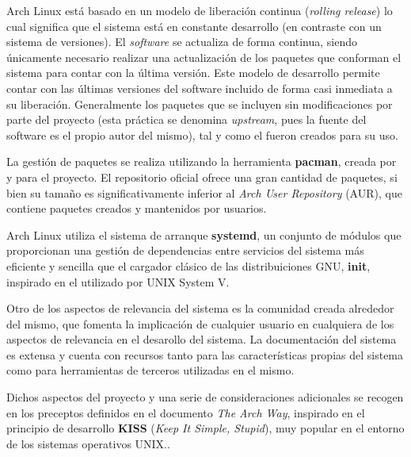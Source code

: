 Arch Linux está basado en un modelo de liberación continua (\textit{rolling release}) lo cual significa que el sistema está en constante desarrollo (en contraste con un sistema de versiones). El \textit{software} se actualiza de forma continua, siendo únicamente necesario realizar una actualización de los paquetes que conforman el sistema para contar con la última versión. Este modelo de desarrollo permite contar con las últimas versiones del software incluido de forma casi inmediata a su liberación. Generalmente los paquetes que se incluyen sin modificaciones por parte del proyecto (esta práctica se denomina \textit{upstream}, pues la fuente del software es el propio autor del mismo), tal y como el fueron creados para su uso.

La gestión de paquetes se realiza utilizando la herramienta \textbf{pacman}\cite{pacman}, creada por y para el proyecto. El repositorio oficial ofrece una gran cantidad de paquetes, si bien su tamaño es significativamente inferior al \textit{Arch User Repository} (AUR), que contiene paquetes creados y mantenidos por usuarios.

Arch Linux utiliza el sistema de arranque \textbf{systemd}\cite{systemd}, un conjunto de módulos que proporcionan una gestión de dependencias entre servicios del sistema más eficiente y sencilla que el cargador clásico de las distribuiciones GNU, \textbf{init}\cite{init}, inspirado en el utilizado por UNIX System V.

Otro de los aspectos de relevancia del sistema es la comunidad creada alrededor del mismo, que fomenta la implicación de cualquier usuario en cualquiera de los aspectos de relevancia en el desarollo del sistema. La documentación del sistema es extensa y cuenta con recursos tanto para las características propias del sistema como para herramientas de terceros utilizadas en el mismo. %

Dichos aspectos del proyecto y una serie de consideraciones adicionales se recogen en los preceptos definidos en el documento \textit{The Arch Way}\cite{thearchway}, inspirado en el principio de desarrollo \textbf{KISS} (\textit{Keep It Simple, Stupid}), muy popular en el entorno de los sistemas operativos UNIX.. 

